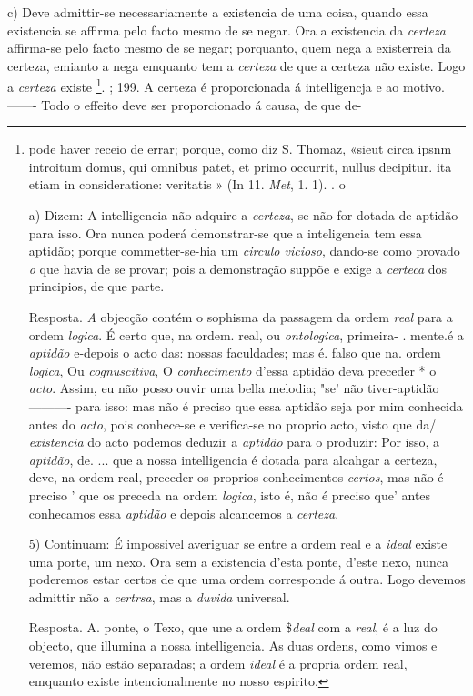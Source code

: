 c) Deve admittir-se necessariamente a existencia de uma coisa, quando essa existencia se affirma pelo facto mesmo de se negar. Ora a existencia da \emph{certeza} affirma-se pelo facto mesmo de se negar; porquanto, quem nega a existerreia da certeza, emianto a nega emquanto tem a \emph{certeza} de que a certeza não existe. Logo a \emph{certeza} existe \footnote{pode haver receio de errar; porque, como diz S. Thomaz, «sieut circa ipsnm introitum domus, qui omnibus patet, et primo occurrit, nullus decipitur. ita etiam in consideratione: veritatis » (In 11. \emph{Met}, 1. 1). . o\par a) Dizem: A intelligencia não adquire a \emph{certeza}, se não for dotada de aptidão para isso. Ora nunca poderá demonstrar-se que a inteligencia tem essa aptidão; porque commetter-se-hia um \emph{circulo vicioso}, dando-se como provado \emph{o} que havia de se provar; pois a demonstração suppõe e exige a \emph{certeca} dos principios, de que parte.\par Resposta. \emph{A} objecção contém o sophisma da passagem da ordem \emph{real} para a ordem \emph{logica}. É certo que, na ordem. real, ou \emph{ontologica}, primeira- . mente.é a \emph{aptidão} e-depois o acto das: nossas faculdades; mas é. falso que na. ordem \emph{logica}, Ou \emph{cognuscitiva}, O \emph{conhecimento} d'essa aptidão deva preceder * o \emph{acto}. Assim, eu não posso ouvir uma bella melodia; "se' não tiver-aptidão ---------- para isso: mas não é preciso que essa aptidão seja por mim conhecida antes do \emph{acto}, pois conhece-se e verifica-se no proprio acto, visto que da/ \emph{existencia} do acto podemos deduzir a \emph{aptidão} para o produzir: Por isso, a \emph{aptidão}, de. ... que a nossa intelligencia é dotada para alcahgar a certeza, deve, na ordem real, preceder os proprios conhecimentos \emph{certos}, mas não é preciso ' que os preceda na ordem \emph{logica}, isto é, não é preciso que' antes conhecamos essa \emph{aptidão} e depois alcancemos a \emph{certeza}.\par 5) Continuam: É impossivel averiguar se entre a ordem real e a \emph{ideal} existe uma porte, um nexo. Ora sem a existencia d'esta ponte, d'este nexo, nunca poderemos estar certos de que uma ordem corresponde á outra. Logo devemos admittir não a \emph{certrsa}, mas a \emph{duvida} universal.\par Resposta. A. ponte, o Texo, que une a ordem \$\emph{deal} com a \emph{real}, é a luz do objecto, que illumina a nossa intelligencia. As duas ordens, como vimos e veremos, não estão separadas; a ordem \emph{ideal} é a propria ordem real, emquanto existe intencionalmente no nosso espirito.}. \textbar{} ; 199. A certeza é proporcionada á intelligencja e ao motivo. ------- Todo o effeito deve ser proporcionado á causa, de que de-

